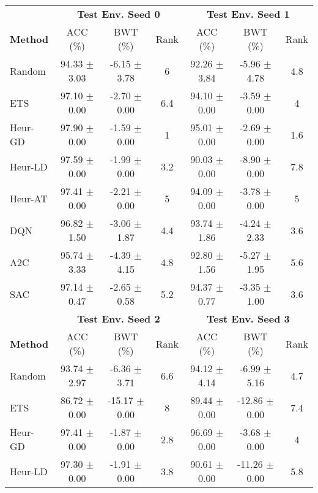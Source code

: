 \begin{tabular}{lcccccc}
	\toprule 
	& \multicolumn{3}{c}{\textbf{Test Env. Seed 0}} & \multicolumn{3}{c}{\textbf{Test Env. Seed 1}} \\
	\cmidrule(lr){2-4} \cmidrule(lr){5-7}
	\textbf{Method} & ACC (\%)         & BWT (\%)          & Rank   & ACC (\%)         & BWT (\%)          & Rank   \\
	\midrule 
	Random          & 94.33 $\pm$ 3.03   & -6.15 $\pm$ 3.78    & 6      & 92.26 $\pm$ 3.84   & -5.96 $\pm$ 4.78    & 4.8    \\
	ETS             & 97.10 $\pm$ 0.00   & -2.70 $\pm$ 0.00    & 6.4    & 94.10 $\pm$ 0.00   & -3.59 $\pm$ 0.00    & 4      \\
	Heur-GD         & 97.90 $\pm$ 0.00   & -1.59 $\pm$ 0.00    & 1      & 95.01 $\pm$ 0.00   & -2.69 $\pm$ 0.00    & 1.6    \\
	Heur-LD         & 97.59 $\pm$ 0.00   & -1.99 $\pm$ 0.00    & 3.2    & 90.03 $\pm$ 0.00   & -8.90 $\pm$ 0.00    & 7.8    \\
	Heur-AT         & 97.41 $\pm$ 0.00   & -2.21 $\pm$ 0.00    & 5      & 94.09 $\pm$ 0.00   & -3.78 $\pm$ 0.00    & 5      \\
	DQN             & 96.82 $\pm$ 1.50   & -3.06 $\pm$ 1.87    & 4.4    & 93.74 $\pm$ 1.86   & -4.24 $\pm$ 2.33    & 3.6    \\
	A2C             & 95.74 $\pm$ 3.33   & -4.39 $\pm$ 4.15    & 4.8    & 92.80 $\pm$ 1.56   & -5.27 $\pm$ 1.95    & 5.6    \\
	SAC             & 97.14 $\pm$ 0.47   & -2.65 $\pm$ 0.58    & 5.2    & 94.37 $\pm$ 0.77   & -3.35 $\pm$ 1.00    & 3.6    \\
	\midrule 
	& \multicolumn{3}{c}{\textbf{Test Env. Seed 2}} & \multicolumn{3}{c}{\textbf{Test Env. Seed 3}} \\
	\cmidrule(lr){2-4} \cmidrule(lr){5-7}
	\textbf{Method} & ACC (\%)         & BWT (\%)          & Rank   & ACC (\%)         & BWT (\%)          & Rank   \\
	\midrule 
	Random          & 93.74 $\pm$ 2.97   & -6.36 $\pm$ 3.71    & 6.6    & 94.12 $\pm$ 4.14   & -6.99 $\pm$ 5.16    & 4.7    \\
	ETS             & 86.72 $\pm$ 0.00   & -15.17 $\pm$ 0.00   & 8      & 89.44 $\pm$ 0.00   & -12.86 $\pm$ 0.00   & 7.4    \\
	Heur-GD         & 97.41 $\pm$ 0.00   & -1.87 $\pm$ 0.00    & 2.8    & 96.69 $\pm$ 0.00   & -3.68 $\pm$ 0.00    & 4      \\
	Heur-LD         & 97.30 $\pm$ 0.00   & -1.91 $\pm$ 0.00    & 3.8    & 90.61 $\pm$ 0.00   & -11.26 $\pm$ 0.00   & 5.8    \\

\end{tabular}
